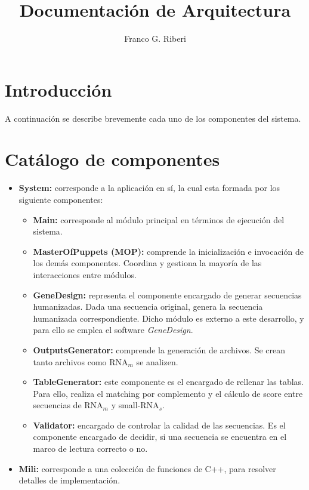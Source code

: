 \documentclass[12pt,a4paper]{article}
\title{Documentación de Arquitectura}
\author{Franco G. Riberi}
\begin{document}

\section*{Introducción}
A continuación se describe brevemente cada uno de los componentes del sistema.

\section*{Catálogo de componentes}
\begin{itemize}
    \item \textbf{System:} corresponde a la aplicación en sí, la cual esta formada por los siguiente
        componentes:    
        \begin{itemize}
              \item \textbf{Main:} corresponde al módulo principal en términos de ejecución del sistema.

              \item \textbf{MasterOfPuppets (MOP):}  comprende la inicialización e invocación de los
              demás componentes. Coordina y gestiona la mayoría de las interacciones entre módulos.

              \item \textbf{GeneDesign:} representa el componente encargado de generar secuencias humanizadas.
              Dada una secuencia original, genera la secuencia humanizada correspondiente. Dicho
              módulo es externo a este desarrollo, y para ello se emplea el software \emph{GeneDesign}.

              \item \textbf{OutputsGenerator:} comprende la generación de archivos. Se crean tanto archivos
              como RNA$_m$ se analizen.

              \item \textbf{TableGenerator:} este componente es el encargado de rellenar las tablas. Para ello,
              realiza el matching por complemento y el cálculo de score entre secuencias de RNA$_m$ y 
              small-RNA$_s$. 

              \item \textbf{Validator:} encargado de controlar la calidad de las secuencias. Es el componente
              encargado de decidir, si una secuencia se encuentra en el marco de lectura correcto o no.
                
        \end{itemize}
    \item \textbf{Mili:} corresponde a una colección de funciones de C++, para resolver detalles de
     implementación.


\end{itemize}
\end{document}
